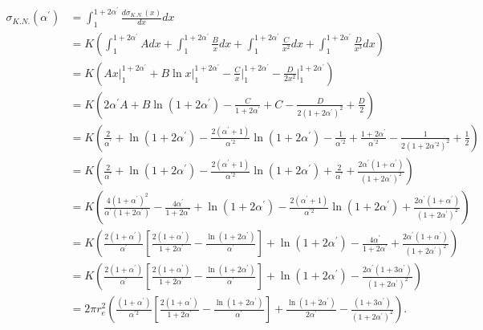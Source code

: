 \begin{align}
  \sigma_{K.N.}(\alpha^{'}) & = \int_1^{1+2\alpha^{'}} \frac{d\sigma_{K.N.}(x)}{dx} dx
  \nonumber \\
  & = K \left(\int_1^{1+2\alpha^{'}} A dx + 
    \int_1^{1+2\alpha^{'}} \frac{B}{x} dx + 
    \int_1^{1+2\alpha^{'}} \frac{C}{x^2} dx + 
    \int_1^{1+2\alpha^{'}} \frac{D}{x^3} dx \right) \nonumber \\
  & = K \left(Ax \Bigg|_1^{1+2\alpha^{'}} + B\ln{x}\Bigg|_1^{1+2\alpha^{'}} -
    \frac{C}{x} \Bigg|_1^{1+2\alpha^{'}} - \frac{D}{2x^2} \Bigg|_1^{1+2\alpha^{'}}
    \right) \nonumber \\
  & = K \left(2\alpha^{'}A + B\ln{(1+2\alpha^{'})} - \frac{C}{1+2\alpha^{'}} + C -
    \frac{D}{2(1+2\alpha^{'})^2} + \frac{D}{2} \right) \nonumber \\
  & = K \left(\frac{2}{\alpha^{'}} + \ln{(1 + 2\alpha^{'})} -
    \frac{2(\alpha^{'}+1)}{\alpha^{'2}}\ln{(1+2\alpha^{'})} - 
    \frac{1}{\alpha^{'2}} + \frac{1+2\alpha^{'}}{\alpha^{'2}} - 
    \frac{1}{2(1+2\alpha^{'2})^2} + \frac{1}{2} \right) \nonumber \\
  & = K \left(\frac{2}{\alpha^{'}} + \ln{(1 + 2\alpha^{'})} -
    \frac{2(\alpha^{'}+1)}{\alpha^{'2}}\ln{(1+2\alpha^{'})} + 
    \frac{2}{\alpha^{'}} + \frac{2\alpha^{'}(1+\alpha^{'})}{(1+2\alpha^{'})^2} 
    \right) \nonumber \\
  & = K \left(\frac{4(1+\alpha^{'})^2}{\alpha^{'}(1+2\alpha^{'})} - 
      \frac{4\alpha^{'}}{1+2\alpha^{'}} + \ln{(1 + 2\alpha^{'})} -
    \frac{2(\alpha^{'}+1)}{\alpha^{'2}}\ln{(1+2\alpha^{'})} + 
    \frac{2\alpha^{'}(1+\alpha^{'})}{(1+2\alpha^{'})^2} 
    \right) \nonumber \\
  & = K \left(\frac{2(1+\alpha^{'})}{\alpha^{'}} 
    \left[\frac{2(1+\alpha^{'})}{1+2\alpha^{'}} - 
    \frac{\ln{(1+2\alpha^{'})}}{\alpha^{'}} \right] + \ln{(1 + 2\alpha^{'})} -
    \frac{4\alpha^{'}}{1+2\alpha^{'}} + 
    \frac{2\alpha^{'}(1+\alpha^{'})}{(1+2\alpha^{'})^2} \right) \nonumber \\
  & = K \left(\frac{2(1+\alpha^{'})}{\alpha^{'}} 
    \left[\frac{2(1+\alpha^{'})}{1+2\alpha^{'}} - 
    \frac{\ln{(1+2\alpha^{'})}}{\alpha^{'}} \right] + \ln{(1 + 2\alpha^{'})} -
    \frac{2\alpha^{'}(1+3\alpha^{'})}{(1+2\alpha^{'})^2} \right) \nonumber \\
  & = 2\pi r_e^2 \left(\frac{(1+\alpha^{'})}{\alpha^{'2}} 
    \left[\frac{2(1+\alpha^{'})}{1+2\alpha^{'}} - 
    \frac{\ln{(1+2\alpha^{'})}}{\alpha^{'}} \right] +
    \frac{\ln{(1 + 2\alpha^{'})}}{2\alpha^{'}} - 
    \frac{(1+3\alpha^{'})}{(1+2\alpha^{'})^2} \right).
\end{align}

